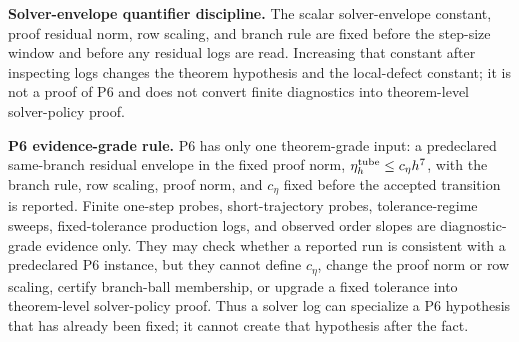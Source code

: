 \documentclass[preprint,12pt]{elsarticle}
\begin{document}
\noindent\textbf{Solver-envelope quantifier discipline.}
The scalar solver-envelope constant, proof
residual norm, row scaling, and branch rule are fixed before the step-size
window and before any residual logs are read. Increasing that constant after
inspecting logs changes the theorem hypothesis and the local-defect constant;
it is not a proof of P6 and does not convert finite diagnostics into
theorem-level solver-policy proof.

\noindent\textbf{P6 evidence-grade rule.}
P6 has only one theorem-grade input: a predeclared same-branch residual
envelope in the fixed proof norm,
\(\eta_h^{\rm tube}\le c_\eta h^7\), with the branch rule, row scaling,
proof norm, and \(c_\eta\) fixed before the accepted transition is reported.
Finite one-step probes, short-trajectory probes, tolerance-regime sweeps,
fixed-tolerance production logs, and observed order slopes are
diagnostic-grade evidence only.  They may check whether a reported run is
consistent with a predeclared P6 instance, but they cannot define
\(c_\eta\), change the proof norm or row scaling, certify branch-ball
membership, or upgrade a fixed tolerance into theorem-level solver-policy
proof.  Thus a solver log can specialize a P6 hypothesis that has already
been fixed; it cannot create that hypothesis after the fact.
\end{document}
